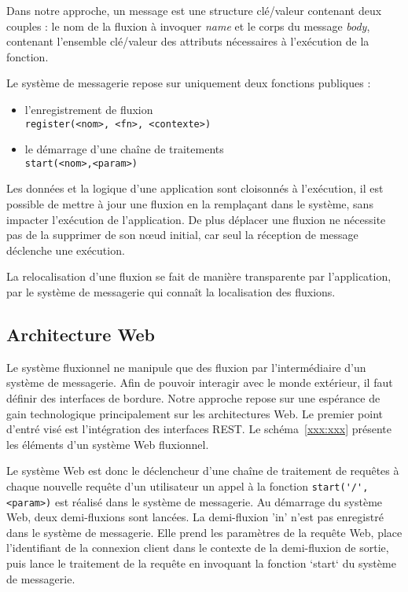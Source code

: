 Dans notre approche, un message est une structure clé/valeur
contenant deux couples : le nom de la fluxion à invoquer \textit{name} et le
corps du message \textit{body}, contenant l'ensemble clé/valeur des
attributs nécessaires à l'exécution de la fonction. 

Le système de messagerie repose sur uniquement deux fonctions publiques :
\begin{itemize}
  \item l'enregistrement de fluxion\\
    \texttt{register(<nom>, <fn>, <contexte>)}
  \item le démarrage d'une chaîne de traitements\\
    \texttt{start(<nom>,<param>)}
\end{itemize}

Les données et la logique d'une application sont cloisonnés
à l'exécution, il est possible de mettre à jour une
fluxion en la remplaçant dans le système, sans impacter l'exécution de
l'application. De plus déplacer une fluxion ne nécessite pas de la
supprimer de son n\oe ud initial, car seul la réception de message
déclenche une exécution. 

La relocalisation d'une fluxion se fait de manière transparente
par l'application, par le système de messagerie qui connaît la
localisation des fluxions. 

\subsection{Architecture Web}

Le système fluxionnel ne manipule que des fluxion par l'intermédiaire d'un
système de messagerie. Afin de pouvoir interagir avec le monde extérieur,
il faut définir des interfaces de bordure. Notre approche repose sur une
espérance de gain technologique principalement sur les architectures Web.
Le premier point d'entré visé est l'intégration des interfaces REST.  Le
schéma~\ref{xxx:xxx} présente les éléments d'un système Web fluxionnel.


Le système Web est donc le déclencheur d'une chaîne de traitement de
requêtes à chaque nouvelle requête d'un utilisateur un appel à la fonction
\lstinline|start('/', <param>)| est réalisé dans le système de messagerie.
Au démarrage du système Web, deux demi-fluxions sont lancées.  La
demi-fluxion 'in' n'est pas enregistré dans le système de messagerie.
Elle prend les paramètres de la requête Web, place l'identifiant de la
connexion client dans le contexte de la demi-fluxion de sortie, puis lance
le traitement de la requête en invoquant la fonction `start` du système de
messagerie.

